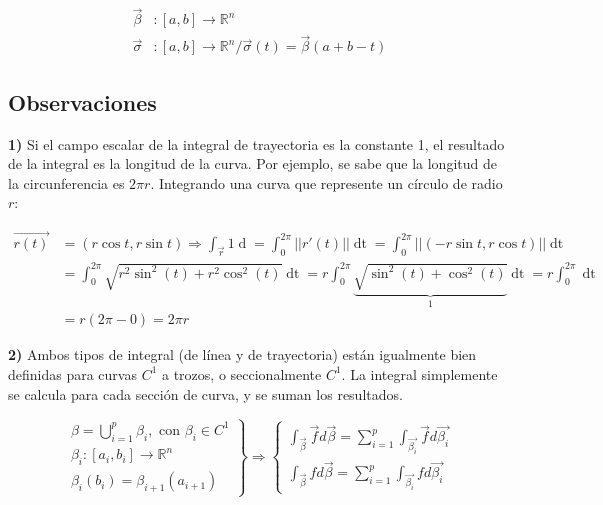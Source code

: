 \documentclass{article}
\renewcommand{\Bbb}{\mathbb}
\begin{document}
\begin{align}
\overrightarrow{\beta} &: [a, b] \rightarrow \Bbb R^n \\
\overrightarrow{\sigma} &: [a, b] \rightarrow \Bbb R^n / \overrightarrow{\sigma}(t) = \overrightarrow{\beta}(a + b - t) 
\end{align}

\subsection{Observaciones}

\textbf{1)} Si el campo escalar de la integral de trayectoria es la constante 1, el resultado de la integral es la longitud de la curva. Por ejemplo, se sabe que la longitud de la circunferencia es $2 \pi r$. Integrando una curva que represente un círculo de radio $r$:

\begin{align}
\overrightarrow{r(t)} &= (r \cos t, r \sin t) \Rightarrow \int_{\overrightarrow{r}} 1 \mathop{d\overrightarrow{r}} = \int_{0}^{2 \pi} ||r'(t)|| \mathop{dt} = \int_{0}^{2 \pi} ||(-r \sin t, r \cos t)|| \mathop{dt} \\
&= \int_{0}^{2 \pi} \sqrt{r^2 \sin^2 (t) + r^2 \cos^2 (t)} \mathop{dt} = r \int_{0}^{2 \pi} \underbrace{ \sqrt{\sin^2(t) + \cos^2(t)} }_{1} \mathop{dt} = r \int_{0}^{2 \pi} \mathop{dt} \\
&= r (2 \pi - 0) = 2 \pi r
\end{align}

\textbf{2)} Ambos tipos de integral (de línea y de trayectoria) están igualmente bien definidas para curvas $C^1$ a trozos, o seccionalmente $C^1$. La integral simplemente se calcula para cada sección de curva, y se suman los resultados.

\begin{equation}
\left.
\begin{array}{ll}
\beta = \bigcup\limits_{i=1}^p \beta_i, \text{ con } \beta_i \in C^1 \\
\beta_i: [a_i, b_i] \rightarrow \Bbb R^n \\
\beta_{i}(b_i) = \beta_{i+1}(a_{i+1})
\end{array}
\right\} \Rightarrow
\left\{
\begin{array}{ll}
\int_{\overrightarrow{\beta}} \overrightarrow{f} d\overrightarrow{\beta} = \sum\limits_{i=1}^p \int_{\overrightarrow{\beta_i}} \overrightarrow{f} d\overrightarrow{\beta_i} \\
\int_{\overrightarrow{\beta}} f d\overrightarrow{\beta} = \sum\limits_{i=1}^p \int_{\overrightarrow{\beta_i}} f d\overrightarrow{\beta_i}
\end{array}
\right.
\end{equation}
\end{document}
